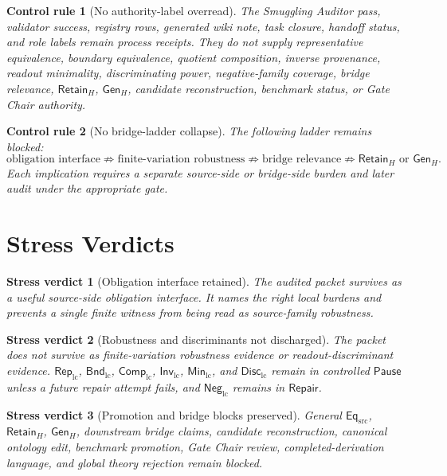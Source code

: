 \documentclass[11pt]{article}
\newcommand{\EqSrc}{\mathsf{Eq}_{\mathrm{src}}}
\newcommand{\RepLC}{\mathsf{Rep}_{\mathrm{lc}}}
\newcommand{\BndLC}{\mathsf{Bnd}_{\mathrm{lc}}}
\newcommand{\CompLC}{\mathsf{Comp}_{\mathrm{lc}}}
\newcommand{\InvLC}{\mathsf{Inv}_{\mathrm{lc}}}
\newcommand{\MinLC}{\mathsf{Min}_{\mathrm{lc}}}
\newcommand{\DiscLC}{\mathsf{Disc}_{\mathrm{lc}}}
\newcommand{\NegLC}{\mathsf{Neg}_{\mathrm{lc}}}
\newcommand{\RetainH}{\mathsf{Retain}_{H}}
\newcommand{\GenH}{\mathsf{Gen}_{H}}
\newcommand{\Pause}{\mathsf{Pause}}
\newcommand{\Repair}{\mathsf{Repair}}
\newtheorem{controlrule}{Control rule}
\newtheorem{verdict}{Stress verdict}
\begin{document}
\begin{controlrule}[No authority-label overread]
The Smuggling Auditor pass, validator success, registry rows, generated
wiki note, task closure, handoff status, and role labels remain
process receipts. They do not supply representative equivalence,
boundary equivalence, quotient composition, inverse provenance, readout
minimality, discriminating power, negative-family coverage, bridge
relevance, \(\RetainH\), \(\GenH\), candidate reconstruction,
benchmark status, or Gate Chair authority.
\end{controlrule}

\begin{controlrule}[No bridge-ladder collapse]
The following ladder remains blocked:
\[
\text{obligation interface}
\not\Rightarrow
\text{finite-variation robustness}
\not\Rightarrow
\text{bridge relevance}
\not\Rightarrow
\RetainH \text{ or } \GenH .
\]
Each implication requires a separate source-side or bridge-side burden
and later audit under the appropriate gate.
\end{controlrule}

\section{Stress Verdicts}

\begin{verdict}[Obligation interface retained]
The audited packet survives as a useful source-side obligation
interface. It names the right local burdens and prevents a single
finite witness from being read as source-family robustness.
\end{verdict}

\begin{verdict}[Robustness and discriminants not discharged]
The packet does not survive as finite-variation robustness evidence or
readout-discriminant evidence. \(\RepLC\), \(\BndLC\), \(\CompLC\),
\(\InvLC\), \(\MinLC\), and \(\DiscLC\) remain in controlled
\(\Pause\) unless a future repair attempt fails, and \(\NegLC\)
remains in \(\Repair\).
\end{verdict}

\begin{verdict}[Promotion and bridge blocks preserved]
General \(\EqSrc\), \(\RetainH\), \(\GenH\), downstream bridge claims,
candidate reconstruction, canonical ontology edit, benchmark
promotion, Gate Chair review, completed-derivation language, and
global theory rejection remain blocked.
\end{verdict}
\end{document}
